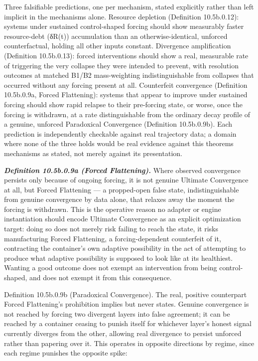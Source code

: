 \documentclass[
]{article}
\begin{document}
Three falsifiable predictions, one per mechanism, stated explicitly
rather than left implicit in the mechanisms alone. Resource depletion
(Definition 10.5b.0.12): systems under sustained control-shaped forcing
should show measurably faster resource-debt (δR(t)) accumulation than an
otherwise-identical, unforced counterfactual, holding all other inputs
constant. Divergence amplification (Definition 10.5b.0.13): forced
interventions should show a real, measurable rate of triggering the very
collapse they were intended to prevent, with resolution outcomes at
matched B1/B2 mass-weighting indistinguishable from collapses that
occurred without any forcing present at all. Counterfeit convergence
(Definition 10.5b.0.9a, Forced Flattening): systems that appear to
improve under sustained forcing should show rapid relapse to their
pre-forcing state, or worse, once the forcing is withdrawn, at a rate
distinguishable from the ordinary decay profile of a genuine, unforced
Paradoxical Convergence (Definition 10.5b.0.9b). Each prediction is
independently checkable against real trajectory data; a domain where
none of the three holds would be real evidence against this theorems
mechanisms as stated, not merely against its presentation.

\emph{\textbf{Definition 10.5b.0.9a (Forced Flattening).}} Where
observed convergence persists only because of ongoing forcing, it is not
genuine Ultimate Convergence at all, but Forced Flattening --- a
propped-open false state, indistinguishable from genuine convergence by
data alone, that relaxes away the moment the forcing is withdrawn. This
is the operative reason no adapter or engine instantiation should encode
Ultimate Convergence as an explicit optimization target: doing so does
not merely risk failing to reach the state, it risks manufacturing
Forced Flattening, a forcing-dependent counterfeit of it, contracting
the container's own adaptive possibility in the act of attempting to
produce what adaptive possibility is supposed to look like at its
healthiest. Wanting a good outcome does not exempt an intervention from
being control-shaped, and does not exempt it from this consequence.

Definition 10.5b.0.9b (Paradoxical Convergence). The real, positive
counterpart Forced Flattening's prohibition implies but never states.
Genuine convergence is not reached by forcing two divergent layers into
false agreement; it can be reached by a container ceasing to punish
itself for whichever layer's honest signal currently diverges from the
other, allowing real divergence to persist unforced rather than papering
over it. This operates in opposite directions by regime, since each
regime punishes the opposite spike:
\end{document}

